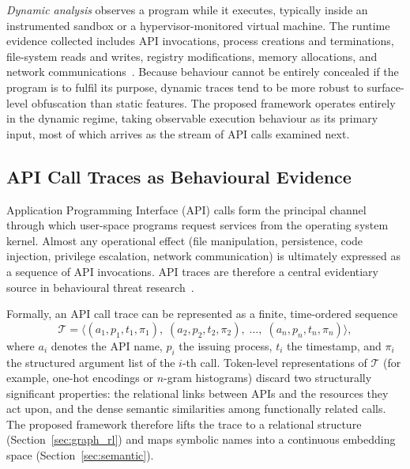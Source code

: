 \documentclass[%
    BCOR=10mm,
    DIV=13,
    toc=bibliography,
    toc=listof,
    oneside,
    12pt,
]{scrbook}
\begin{document}
\textit{Dynamic analysis} observes a program while it executes, typically
inside an instrumented sandbox or a hypervisor-monitored virtual machine. The
runtime evidence collected includes API invocations, process creations and
terminations, file-system reads and writes, registry modifications, memory
allocations, and network communications~\cite{mimura2022nlp}. Because behaviour
cannot be entirely concealed if the program is to fulfil its purpose, dynamic
traces tend to be more robust to surface-level obfuscation than static
features. The proposed framework operates entirely in the dynamic regime,
taking observable execution behaviour as its primary input, most of which arrives
as the stream of API calls examined next.

\subsection{API Call Traces as Behavioural Evidence}
\label{subsec:api_traces}

Application Programming Interface (API) calls form the principal channel
through which user-space programs request services from the operating system
kernel. Almost any operational effect (file manipulation, persistence, code
injection, privilege escalation, network communication) is ultimately
expressed as a sequence of API invocations. API traces are therefore a central
evidentiary source in behavioural threat research~\cite{ucci2019survey,
nguyen2023, guo2023zeroday}.

Formally, an API call trace can be represented as a finite, time-ordered
sequence
\begin{equation}
  \mathcal{T} = \bigl\langle (a_1, p_1, t_1, \pi_1),\;
                              (a_2, p_2, t_2, \pi_2),\;
                              \ldots,\;
                              (a_n, p_n, t_n, \pi_n) \bigr\rangle,
  \label{eq:api_trace}
\end{equation}
where $a_i$ denotes the API name, $p_i$ the issuing process, $t_i$ the
timestamp, and $\pi_i$ the structured argument list of the $i$-th call.
Token-level representations of $\mathcal{T}$ (for example, one-hot encodings
or $n$-gram histograms) discard two structurally significant properties: the
relational links between APIs and the resources they act upon, and the dense
semantic similarities among functionally related calls. The proposed
framework therefore lifts the trace to a relational structure
(Section~\ref{sec:graph_rl}) and maps symbolic names into a continuous
embedding space (Section~\ref{sec:semantic}).
\end{document}
